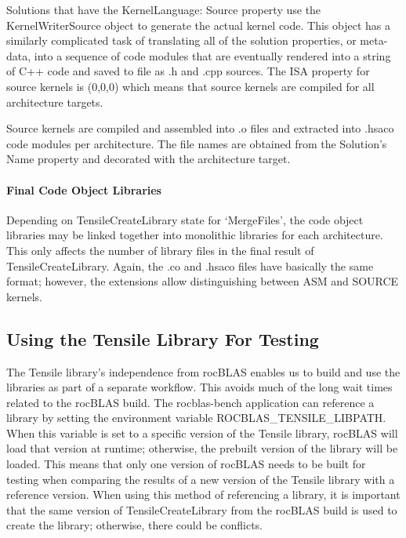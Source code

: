 \documentclass[]{article}
\begin{document}
Solutions that have the KernelLanguage: Source property use the KernelWriterSource object to generate the actual kernel code. This object has a similarly complicated task of translating all of the solution properties, or meta-data, into a sequence of code modules that are eventually rendered into a string of C++ code and saved to file as .h and .cpp sources. The ISA property for source kernels is (0,0,0) which means that source kernels are compiled for all architecture targets.

Source kernels are compiled and assembled into .o files and extracted into .hsaco code modules per architecture. The file names are obtained from the Solution's Name property and decorated with the architecture target.

\paragraph{Final Code Object Libraries}

Depending on TensileCreateLibrary state for `MergeFiles', the code object libraries may be linked together into monolithic libraries for each architecture. This only affects the number of library files in the final result of TensileCreateLibrary. Again, the .co and .hsaco files have basically the same format; however, the extensions allow distinguishing between ASM and SOURCE kernels.

\subsection{Using the Tensile Library For Testing}

The Tensile library's independence from rocBLAS enables us to build and use the libraries as part of a separate workflow. This avoids much of the long wait times related to the rocBLAS build. The rocblas-bench application can reference a library by setting the environment variable ROCBLAS\_TENSILE\_LIBPATH. When this variable is set to a specific version of the Tensile library, rocBLAS will load that version at runtime; otherwise, the prebuilt version of the library will be loaded. This means that only one version of rocBLAS needs to be built for testing when comparing the results of a new version of the Tensile library with a reference version. When using this method of referencing a library, it is important that the same version of TensileCreateLibrary from the rocBLAS build is used to create the library; otherwise, there could be conflicts.
\end{document}
